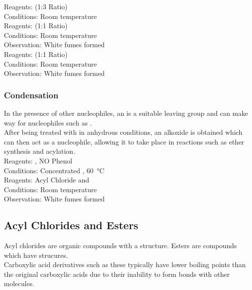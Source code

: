 \documentclass[../main]{subfiles}
\begin{document}
	Reagents:  (1:3 Ratio) \\
	Conditions:  Room temperature \\

	Reagents:  (1:1 Ratio) \\
	Conditions:  Room temperature \\
	Observation: White fumes formed  \\

	Reagents:  (1:1 Ratio) \\
	Conditions:  Room temperature \\
	Observation: White fumes formed  \\

	\subsubsection{Condensation}

	In the presence of other nucleophiles, an  is a suitable leaving group and can make way for nucleophiles such as . \\

	After being treated with  in anhydrous conditions, an alkoxide  is obtained which can then act as a nucleophile, allowing it to take place in reactions such as ether synthesis and acylation. \\

	Reagents: , NO Phenol \\
	Conditions:  Concentrated , \SI{60}{\celsius} \\

	Reagents: Acyl Chloride and  \\
	Conditions:  Room temperature \\
	Observation: White fumes formed  \\

	\subsection{Acyl Chlorides and Esters}

	Acyl chlorides are organic compounds with a  structure. Esters are compounds which have  strucures. \\

	Carboxylic acid derivatives such as these typically have lower boiling points than the original carboxylic acids due to their inability to form  bonds with other molecules. \\
\end{document}
